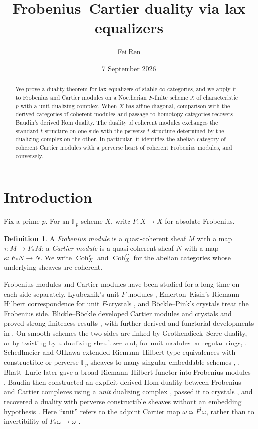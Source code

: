 \documentclass[11pt]{amsart}
\title{Frobenius--Cartier duality via lax equalizers}
\author{Fei Ren}
\date{7 September 2026}
\newcommand{\F}{\mathbb{F}}
\newcommand{\Coh}{\operatorname{{Coh}}}
\theoremstyle{plain}
\theoremstyle{definition}
\newtheorem{definition}[definition]{Definition}
\numberwithin{equation}{section}
\begin{document}
\begin{abstract}
We prove a duality theorem for lax equalizers of stable $\infty$-categories, and we apply it to Frobenius and Cartier modules on a Noetherian $F$-finite scheme $X$ of characteristic $p$ with a unit dualizing complex.
When $X$ has affine diagonal, comparison with the derived categories of coherent modules and passage to homotopy categories recovers Baudin's derived Hom duality.
The duality of coherent modules exchanges the standard $t$-structure on one side with the perverse $t$-structure determined by the dualizing complex on the other.
In particular, it identifies the abelian category of coherent Cartier modules with a perverse heart of coherent Frobenius modules, and conversely.
\end{abstract}
\maketitle
\tableofcontents

\section{Introduction}
Fix a prime $p$. For an $\F_p$-scheme $X$, write $F:X\to X$ for absolute Frobenius.
\begin{definition}
A \textit{Frobenius module} is a quasi-coherent sheaf $M$ with a map $\tau:M\to F_*M$; a \textit{Cartier module} is a quasi-coherent sheaf $N$ with a map $\kappa:F_*N\to N$.
We write $\Coh^F_X$ and $\Coh^C_X$ for the abelian categories whose underlying sheaves are coherent.
\end{definition}
Frobenius modules and Cartier modules have been studied for a long time on each side separately.
Lyubeznik's unit $F$-modules \cite{Lyu97}, Emerton--Kisin's Riemann--Hilbert correspondence for unit $F$-crystals \cite{EK}, and B\"ockle--Pink's crystals \cite{BP} treat the Frobenius side.
Blickle--B\"ockle developed Cartier modules and crystals and proved strong finiteness results \cite[Theorem 4.6; Corollary 4.7]{BB}, with further derived and functorial developments in \cite{BB13}.
On smooth schemes the two sides are linked by Grothendieck--Serre duality, or by twisting by a dualizing sheaf: see \cite[Theorem 5.9; Theorem 5.15]{BB} and, for unit modules on regular rings, \cite[Theorem 2.5]{Ma14}.
Schedlmeier and Ohkawa extended Riemann--Hilbert-type equivalences with constructible or perverse $\F_p$-sheaves to many singular embeddable schemes \cite[Theorem 4.12; Corollary 4.14]{Sch18}, \cite[Theorem 4.12; Theorem 5.5]{Ohk18}.
Bhatt--Lurie later gave a broad Riemann--Hilbert functor into Frobenius modules \cite[Theorem 1.0.2; Theorem 12.1.5]{BL}.
Baudin then constructed an explicit derived Hom duality between Frobenius and Cartier complexes using a \textit{unit} dualizing complex \cite[Theorem 4.2.7]{Bau}, passed it to crystals \cite[Theorem 4.3.5]{Bau}, and recovered a duality with perverse constructible sheaves without an embedding hypothesis \cite[Theorem 5.2.7]{Bau}.
Here ``unit'' refers to the adjoint Cartier map $\omega\simeq F^!\omega$, rather than to invertibility of $F_*\omega\to\omega$ \cite[Definition 4.2.1; Remark 4.2.2]{Bau}.
\end{document}
